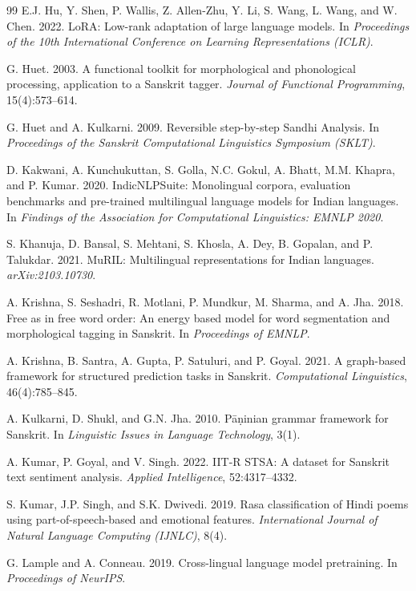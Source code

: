 \documentclass[11pt]{article}
\begin{document}
\begin{thebibliography}{99}
 E.J. Hu, Y. Shen, P. Wallis, Z. Allen-Zhu, Y. Li, S. Wang, L. Wang, and W. Chen. 2022. LoRA: Low-rank adaptation of large language models. In \emph{Proceedings of the 10th International Conference on Learning Representations (ICLR)}.

 G. Huet. 2003. A functional toolkit for morphological and phonological processing, application to a Sanskrit tagger. \emph{Journal of Functional Programming}, 15(4):573--614.

 G. Huet and A. Kulkarni. 2009. Reversible step-by-step Sandhi Analysis. In \emph{Proceedings of the Sanskrit Computational Linguistics Symposium (SKLT)}.

 D. Kakwani, A. Kunchukuttan, S. Golla, N.C. Gokul, A. Bhatt, M.M. Khapra, and P. Kumar. 2020. IndicNLPSuite: Monolingual corpora, evaluation benchmarks and pre-trained multilingual language models for Indian languages. In \emph{Findings of the Association for Computational Linguistics: EMNLP 2020}.

 S. Khanuja, D. Bansal, S. Mehtani, S. Khosla, A. Dey, B. Gopalan, and P. Talukdar. 2021. MuRIL: Multilingual representations for Indian languages. \emph{arXiv:2103.10730}.

 A. Krishna, S. Seshadri, R. Motlani, P. Mundkur, M. Sharma, and A. Jha. 2018. Free as in free word order: An energy based model for word segmentation and morphological tagging in Sanskrit. In \emph{Proceedings of EMNLP}.

 A. Krishna, B. Santra, A. Gupta, P. Satuluri, and P. Goyal. 2021. A graph-based framework for structured prediction tasks in Sanskrit. \emph{Computational Linguistics}, 46(4):785--845.

 A. Kulkarni, D. Shukl, and G.N. Jha. 2010. P\=a\d ninian grammar framework for Sanskrit. In \emph{Linguistic Issues in Language Technology}, 3(1).

 A. Kumar, P. Goyal, and V. Singh. 2022. IIT-R STSA: A dataset for Sanskrit text sentiment analysis. \emph{Applied Intelligence}, 52:4317--4332.

 S. Kumar, J.P. Singh, and S.K. Dwivedi. 2019. Rasa classification of Hindi poems using part-of-speech-based and emotional features. \emph{International Journal of Natural Language Computing (IJNLC)}, 8(4).

 G. Lample and A. Conneau. 2019. Cross-lingual language model pretraining. In \emph{Proceedings of NeurIPS}.


\end{thebibliography}
\end{document}
